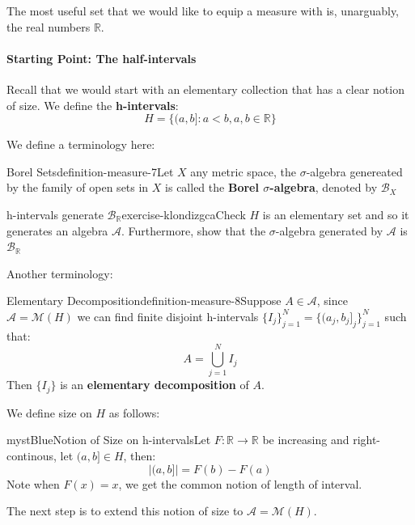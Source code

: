 The most useful set that we would like to equip a measure with is, unarguably, the real numbers $\mathbb{R}$.

\paragraph{Starting Point: The half-intervals}

Recall that we would start with an elementary collection that has a clear notion of size. We define the \textbf{h-intervals}:
\begin{equation}
H=\{(a,b]:a<b, a,b\in \mathbb{R}\}
\end{equation}

We define a terminology here:

\begin{mystthmdefinition}{Borel Sets}{definition-measure-7}Let $X$ any metric space, the $\sigma$-algebra genereated by the family of open sets in $X$ is called the \textbf{Borel $\sigma$-algebra}, denoted by $\mathcal B_{X}$

\end{mystthmdefinition}
\begin{mystexercise}{h-intervals generate $\mathcal B_{\mathbb{R}}$}{exercise-klondizgca}\label{exercise-kLONDizgcA}\label{exercise-klondizgca}Check $H$ is an elementary set and so it generates an algebra $\mathcal A$. Furthermore, show that the $\sigma$-algebra generated by $\mathcal A$ is   $\mathcal B_{\mathbb{R}}$

\end{mystexercise}
Another terminology:

\begin{mystthmdefinition}{Elementary Decomposition}{definition-measure-8}Suppose $A\in \mathcal A$, since $\mathcal A=\mathcal M(H)$ we can find finite disjoint h-intervals $\{I_j\}_{j=1}^N=\{(a_j,b_j]_j\}_{j=1}^N$ such that:
\begin{equation}
A=\bigcup_{j=1}^N I_j
\end{equation}
Then $\{I_j\}$ is an \textbf{elementary decomposition} of $A$.

\end{mystthmdefinition}
We define size on $H$ as follows:

\begin{mystadmonition}{mystBlue}{Notion of Size on h-intervals}Let $F:\mathbb{R}\to\mathbb{R}$ be increasing and right-continous, let $(a,b]\in H$, then:
\begin{equation}
|(a,b]|=F(b)-F(a)
\end{equation}
Note when $F(x)=x$, we get the common notion of length of interval.

\end{mystadmonition}
The next step is to extend this notion of size to $\mathcal A=\mathcal M(H)$.

